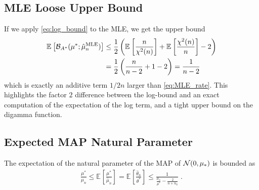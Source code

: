 \documentclass{article}
\newcommand*{\expect}[2][]{\ensuremath{\mathbb{E}_{#1} \left[ #2 \right] }} %
\newcommand{\logpart}{A}
\newcommand{\bregmanconj}{\cB_{\logpart^*}}
\newcommand{\natp}{\theta}
\newcommand{\MAPm}{\hat \mu_n}
\newcommand{\MAPt}{\hat \natp_n}
\begin{document}
	
\subsection{MLE Loose Upper Bound}
If we apply \eqref{eq:log_bound} to the MLE, we get the upper bound
\begin{align}
	\expect{\bregmanconj(\mu^*; \MAPm^\text{MLE})}
	&\leq  \half \left( \expect{\frac{n}{\chi^2(n)}} + \expect{\frac{\chi^2(n)}{n}} - 2 \right ) \\
	&= \half \left( \frac{n}{n-2} + 1 - 2 \right)  
	= \frac{1}{n-2}
\end{align}
which is exactly  an additive term $1/2n$ larger than \eqref{eq:MLE_rate}. This highlights the factor $2$ difference between the log-bound and an exact computation of the expectation of the log term, and a tight upper bound on the digamma function.

\subsection{Expected MAP Natural Parameter}
\begin{lemma}
	The expectation of the natural parameter of the MAP of ${\mathcal N}(0,\mu_*)$ is bounded as
	\begin{align}
		\frac{\mu^*}{\mu_n}
		\leq \expect{\frac{\mu^*}{\MAPm}} 
		= \expect{\frac{\MAPt}{\natp^*}} 
		\leq \frac{1}{\frac{\mu_n}{\mu^*} - \frac{2}{n+n_0}} \; .
	\end{align}
\end{lemma}
\end{document}
